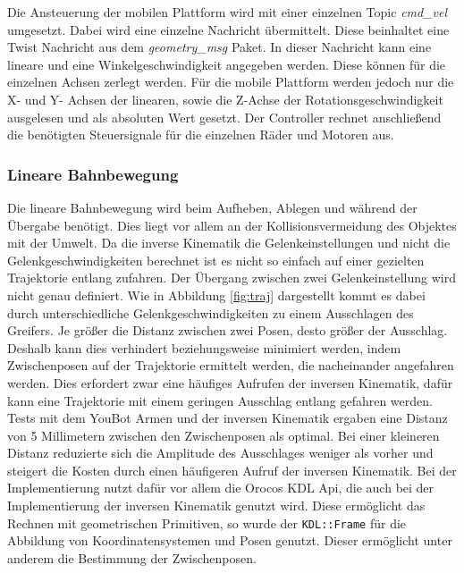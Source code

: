 Die Ansteuerung der mobilen Plattform wird mit einer einzelnen Topic \textit{cmd\_vel} umgesetzt. Dabei wird eine einzelne Nachricht übermittelt. Diese beinhaltet eine Twist Nachricht aus dem \textit{geometry\_msg} Paket. In dieser Nachricht kann eine lineare und eine Winkelgeschwindigkeit angegeben werden. Diese können für die einzelnen Achsen zerlegt werden. Für die mobile Plattform werden jedoch nur die X- und Y- Achsen der linearen, sowie die Z-Achse der Rotationsgeschwindigkeit ausgelesen und als absoluten Wert gesetzt. Der Controller rechnet anschließend die benötigten Steuersignale für die einzelnen Räder und Motoren aus.

\subsubsection{Lineare Bahnbewegung}
\label{sec:impl-res-lb}
Die lineare Bahnbewegung wird beim Aufheben, Ablegen und während der Übergabe benötigt. Dies liegt vor allem an der Kollisionsvermeidung des Objektes mit der Umwelt. Da die inverse Kinematik die Gelenkeinstellungen und nicht die Gelenkgeschwindigkeiten berechnet ist es nicht so einfach auf einer gezielten Trajektorie entlang zufahren. Der Übergang zwischen zwei Gelenkeinstellung wird nicht genau definiert. Wie in Abbildung \ref{fig:traj} dargestellt kommt es dabei durch unterschiedliche Gelenkgeschwindigkeiten zu einem Ausschlagen des Greifers. Je größer die Distanz zwischen zwei Posen, desto größer der Ausschlag. Deshalb kann dies verhindert beziehungsweise minimiert werden, indem Zwischenposen auf der Trajektorie ermittelt werden, die nacheinander angefahren werden. Dies erfordert zwar eine häufiges Aufrufen der inversen Kinematik, dafür kann eine Trajektorie mit einem geringen Ausschlag entlang gefahren werden. Tests mit dem YouBot Armen und der inversen Kinematik ergaben eine Distanz von 5 Millimetern zwischen den Zwischenposen als optimal. Bei einer kleineren Distanz reduzierte sich die Amplitude des Ausschlages weniger als vorher und steigert die Kosten durch einen häufigeren Aufruf der inversen Kinematik. Bei der Implementierung nutzt dafür vor allem die Orocos KDL Api, die auch bei der Implementierung der inversen Kinematik genutzt wird. Diese ermöglicht das Rechnen mit geometrischen Primitiven, so wurde der \lstinline|KDL::Frame| für die Abbildung von Koordinatensystemen und Posen genutzt. Dieser ermöglicht unter anderem die Bestimmung der Zwischenposen.

